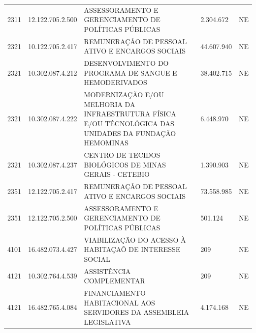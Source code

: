 \documentclass{article}
\begin{document}
\begin{longtable}[c]{m{1cm}|m{2cm}|m{10cm}|m{2cm}|m{1cm}}
\multicolumn{1}{C{1cm}|}{2311} & \multicolumn{1}{C{2cm}|}{12.122.705.2.500} & \multicolumn{1}{L{10cm}|}{ASSESSORAMENTO E GERENCIAMENTO DE POLÍTICAS PÚBLICAS} & \multicolumn{1}{R{2cm}|}{2.304.672} & \multicolumn{1}{C{1cm}}{NE} \\
\multicolumn{1}{C{1cm}|}{2321} & \multicolumn{1}{C{2cm}|}{10.122.705.2.417} & \multicolumn{1}{L{10cm}|}{REMUNERAÇÃO DE PESSOAL ATIVO E ENCARGOS SOCIAIS} & \multicolumn{1}{R{2cm}|}{44.607.940} & \multicolumn{1}{C{1cm}}{NE} \\
\multicolumn{1}{C{1cm}|}{2321} & \multicolumn{1}{C{2cm}|}{10.302.087.4.212} & \multicolumn{1}{L{10cm}|}{DESENVOLVIMENTO DO PROGRAMA DE SANGUE E HEMODERIVADOS} & \multicolumn{1}{R{2cm}|}{38.402.715} & \multicolumn{1}{C{1cm}}{NE} \\
\multicolumn{1}{C{1cm}|}{2321} & \multicolumn{1}{C{2cm}|}{10.302.087.4.222} & \multicolumn{1}{L{10cm}|}{MODERNIZAÇÃO E/OU MELHORIA DA INFRAESTRUTURA FÍSICA E/OU TÉCNOLÓGICA DAS UNIDADES DA FUNDAÇÃO HEMOMINAS} & \multicolumn{1}{R{2cm}|}{6.448.970} & \multicolumn{1}{C{1cm}}{NE} \\
\multicolumn{1}{C{1cm}|}{2321} & \multicolumn{1}{C{2cm}|}{10.302.087.4.237} & \multicolumn{1}{L{10cm}|}{CENTRO DE TECIDOS BIOLÓGICOS DE MINAS GERAIS - CETEBIO} & \multicolumn{1}{R{2cm}|}{1.390.903} & \multicolumn{1}{C{1cm}}{NE} \\
\multicolumn{1}{C{1cm}|}{2351} & \multicolumn{1}{C{2cm}|}{12.122.705.2.417} & \multicolumn{1}{L{10cm}|}{REMUNERAÇÃO DE PESSOAL ATIVO E ENCARGOS SOCIAIS} & \multicolumn{1}{R{2cm}|}{73.558.985} & \multicolumn{1}{C{1cm}}{NE} \\
\multicolumn{1}{C{1cm}|}{2351} & \multicolumn{1}{C{2cm}|}{12.122.705.2.500} & \multicolumn{1}{L{10cm}|}{ASSESSORAMENTO E GERENCIAMENTO DE POLÍTICAS PÚBLICAS} & \multicolumn{1}{R{2cm}|}{501.124} & \multicolumn{1}{C{1cm}}{NE} \\
\multicolumn{1}{C{1cm}|}{4101} & \multicolumn{1}{C{2cm}|}{16.482.073.4.427} & \multicolumn{1}{L{10cm}|}{VIABILIZAÇÃO DO ACESSO À HABITAÇAÕ DE INTERESSE SOCIAL} & \multicolumn{1}{R{2cm}|}{209} & \multicolumn{1}{C{1cm}}{NE} \\
\multicolumn{1}{C{1cm}|}{4121} & \multicolumn{1}{C{2cm}|}{10.302.764.4.539} & \multicolumn{1}{L{10cm}|}{ASSISTÊNCIA COMPLEMENTAR} & \multicolumn{1}{R{2cm}|}{209} & \multicolumn{1}{C{1cm}}{NE} \\
\multicolumn{1}{C{1cm}|}{4121} & \multicolumn{1}{C{2cm}|}{16.482.765.4.084} & \multicolumn{1}{L{10cm}|}{FINANCIAMENTO HABITACIONAL AOS SERVIDORES DA ASSEMBLEIA LEGISLATIVA} & \multicolumn{1}{R{2cm}|}{4.174.168} & \multicolumn{1}{C{1cm}}{NE} \\

\end{longtable}
\end{document}
